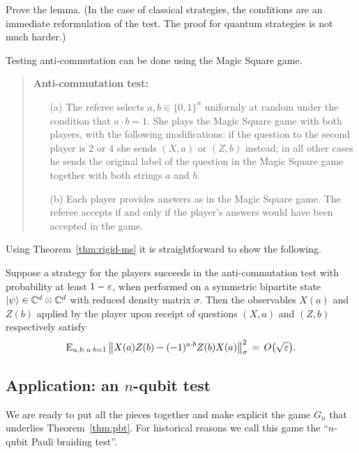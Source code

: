 \begin{exercise}
Prove the lemma. (In the case of classical strategies, the conditions are an immediate reformulation of the test. The proof for quantum strategies is not much harder.)
\end{exercise}

Testing anti-commutation can be done using the Magic Square game. 

\begin{quote}
\textbf{Anti-commutation test:}
\begin{itemize}
\item[(a)] The referee selects $a,b\in\{0,1\}^n$ uniformly at random under the condition that $a\cdot b=1$. She plays the Magic Square game with both players, with the following modifications: if the question to the second player is $2$ or $4$ she sends $(X,a)$ or $(Z,b)$ instead; in all other cases he sends the original label of the question in the Magic Square game together with both strings $a$ and $b$. 
\item[(b)] Each player provides answers as in the Magic Square game. The referee accepts if and only if the player's answers would have been accepted in the game. 
\end{itemize}
\end{quote}

Using Theorem~\ref{thm:rigid-ms} it is straightforward to show the following. 

\begin{lemma}\label{lem:ac}
Suppose a strategy for the players succeeds in the anti-commutation test with probability at least $1-\varepsilon$, when performed on a symmetric bipartite state $|\psi\rangle \in \mathbb{C}^d \otimes \mathbb{C}^d$ with reduced density matrix $\sigma$. Then the observables $X(a)$ and $Z(b)$ applied by the player upon receipt of questions $(X,a)$ and $(Z,b)$ respectively satisfy 
\begin{equation}\label{eq:ac}
 \textsc{E}_{a,b:\,a\cdot b=1} \,\big\| X(a)Z(b)-(-1)^{a\cdot b} Z(b)X(a)\big\|_\sigma^2\,=\,O\big(\sqrt{\varepsilon}\big).
\end{equation}
\end{lemma}

\subsection{Application: an $n$-qubit test}
\label{sec:th101}

We are ready to put all the pieces together and make explicit the game $G_n$ that underlies Theorem~\ref{thm:pbt}. For historical reasons we call this game the ``$n$-qubit Pauli braiding test''. 

